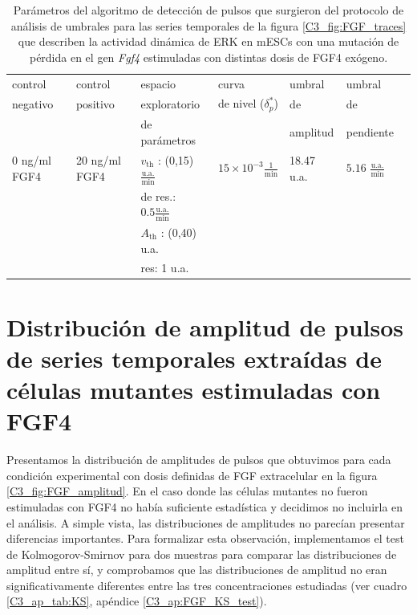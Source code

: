 \documentclass[./main.tex]{subfiles}
\begin{document}
\begin{subappendices}
\begin{table}[htbp]
\begin{adjustwidth}{-0.5in}{-0.5in}%
\centering
\begin{tabular}{|l|l|l|l|l|l|l|}
\hline
 control & control & espacio & curva & umbral & umbral \\
 negativo & positivo & exploratorio & de nivel ($\delta_p^*$) & de & de \\
 &  & de parámetros & & amplitud & pendiente \\
\hline \hline
0 ng/ml FGF4 & 20 ng/ml FGF4 & $v_{\text{th}}$ : (0,15) $\frac{\text{u.a.}}{\text{min}}$ & $15 \times 10^{-3} \frac{1}{\text{min}}$ & 18.47 u.a. & $5.16$ $\frac{\text{u.a.}}{\text{min}}$ \\
 & & de res.: $0.5 \frac{\text{u.a.}}{\text{min}}$ & & & \\
 & & $A_{\text{th}}$ : (0,40) u.a. & & & \\
 & & res: 1 u.a. & & & \\
\hline
\end{tabular}
\end{adjustwidth}
\caption{Parámetros del algoritmo de detección de pulsos que surgieron del protocolo de análisis de umbrales para las series temporales de la figura \ref{C3_fig:FGF_traces} que describen la actividad dinámica de ERK en mESCs con una mutación de pérdida en el gen \textit{Fgf4} estimuladas con distintas dosis de FGF4 exógeno.}
\label{C3_ap_tab:FGF_th}
\end{table}

\section{Distribución de amplitud de pulsos de series temporales extraídas de células mutantes estimuladas con FGF4}
\label{ap_C3:amplitud}

Presentamos la distribución de amplitudes de pulsos que obtuvimos para cada condición experimental con dosis definidas de FGF extracelular en la figura \ref{C3_fig:FGF_amplitud}. En el caso donde las células mutantes no fueron estimuladas con FGF4 no había suficiente estadística y decidimos no incluirla en el análisis. A simple vista, las distribuciones de amplitudes no parecían presentar diferencias importantes. Para formalizar esta observación, implementamos el test de Kolmogorov-Smirnov para dos muestras para comparar las distribuciones de amplitud entre sí, y comprobamos que las distribuciones de amplitud no eran significativamente diferentes entre las tres concentraciones estudiadas (ver cuadro \ref{C3_ap_tab:KS}, apéndice \ref{C3_ap:FGF_KS_test}). 



\end{subappendices}
\end{document}
